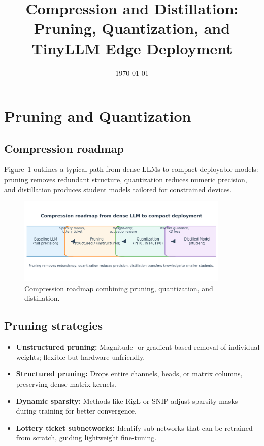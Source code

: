 \documentclass{article}
\title{Compression and Distillation: Pruning, Quantization, and TinyLLM Edge Deployment}
\author{}
\date{\today}
\begin{document}
\maketitle

\section{Pruning and Quantization}
\subsection{Compression roadmap}
Figure~\ref{fig:compression_landscape_en} outlines a typical path from dense LLMs to compact deployable models: pruning removes redundant structure, quantization reduces numeric precision, and distillation produces student models tailored for constrained devices.
\begin{figure}[H]
  \centering
  \includegraphics[width=0.9\textwidth]{compression_landscape.png}
  \caption{Compression roadmap combining pruning, quantization, and distillation.}
  \label{fig:compression_landscape_en}
\end{figure}

\subsection{Pruning strategies}
\begin{itemize}
  \item \textbf{Unstructured pruning:} Magnitude- or gradient-based removal of individual weights; flexible but hardware-unfriendly.
  \item \textbf{Structured pruning:} Drops entire channels, heads, or matrix columns, preserving dense matrix kernels.
  \item \textbf{Dynamic sparsity:} Methods like RigL or SNIP adjust sparsity masks during training for better convergence.
  \item \textbf{Lottery ticket subnetworks:} Identify sub-networks that can be retrained from scratch, guiding lightweight fine-tuning.
\end{itemize}
\end{document}
